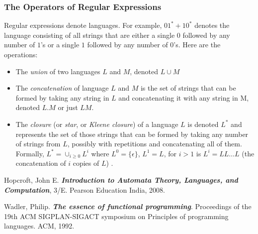 \documentclass[12pt,reqno]{amsart}
\begin{document}
\subsubsection{The Operators of Regular Expressions}
Regular expressions denote languages. For example, \textbf{$01^*+10^*$} denotes the language consisting of all strings that are either a single $0$ followed by any number of $1$'s or a single $1$ followed by any number of $0$'s. Here are the operations:
\begin{itemize}
	\item The \textit{union} of two languages $L$ and $M$, denoted $L\cup M$
	\item The \textit{concatenation} of language $L$ and $M$ is the set of strings that can be formed by taking any string in $L$ and concatenating it with any string in M, denoted $L.M$ or just $LM$.	
	\item The \textit{closure} (or \textit{star}, or \textit{Kleene closure}) of a language $L$ is denoted $L^*$ and represents the set of those strings that can be formed by taking any number of strings from $L$, possibly with repetitions and concatenating all of them. Formally, $L^* = \cup_{i\geq 0}L^i$ where $L^0 = \{ \epsilon\}$, $L^1 = L$, for $i > 1$ is $L^i = LL\ldots L$ (the concatenation of $i$ copies of $L$) .
	
\end{itemize}


\begin{thebibliography}{99} %

Hopcroft, John E. \textbf{\textit{Introduction to Automata Theory, Languages, and Computation}}, 3/E. Pearson Education India, 2008.

Wadler, Philip. \textbf{\textit{The essence of functional programming}}. Proceedings of the 19th ACM SIGPLAN-SIGACT symposium on Principles of programming languages. ACM, 1992.


\end{thebibliography}
\end{document}
